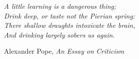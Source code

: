 %
%

\null
{}

\setlength{\epigraphwidth}{.5\textwidth}
\renewcommand{\epigraphsize}{\normalsize}

\epigraph{
    \textit{%
        A little learning is a dangerous thing;\\
        Drink deep, or taste not the Pierian spring:\\
        There shallow draughts intoxicate the brain,\\
        And drinking largely sobers us again.
    }
}{Alexander Pope, \textit{An Essay on Criticism}}

\null
